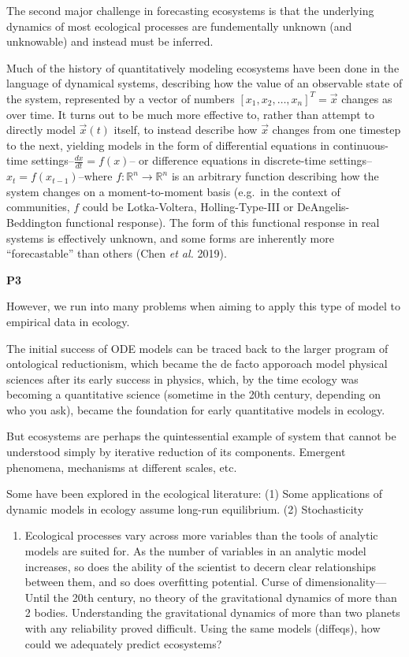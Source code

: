 \documentclass[11pt]{article}
\begin{document}
The second major challenge in forecasting ecosystems is that the
underlying dynamics of most ecological processes are fundementally
unknown (and unknowable) and instead must be inferred.

Much of the history of quantitatively modeling ecosystems have been done
in the language of dynamical systems, describing how the value of an
observable state of the system, represented by a vector of numbers
\([x_1, x_2, \dots, x_n]^T = \vec{x}\) changes as over time. It turns
out to be much more effective to, rather than attempt to directly model
\(\vec{x}(t)\) itself, to instead describe how \(\vec{x}\) changes from
one timestep to the next, yielding models in the form of differential
equations in continuous-time settings--\(\frac{dx}{dt} = f(x)\)-- or
difference equations in discrete-time
settings--\(x_t = f(x_{t-1})\)--where
\(f:\mathbb{R}^n \to \mathbb{R}^n\) is an arbitrary function describing
how the system changes on a moment-to-moment basis (e.g.~in the context
of communities, \(f\) could be Lotka-Voltera, Holling-Type-III or
DeAngelis-Beddington functional response). The form of this functional
response in real systems is effectively unknown, and some forms are
inherently more ``forecastable'' than others (Chen \emph{et al.} 2019).

\textbf{P3}

However, we run into many problems when aiming to apply this type of
model to empirical data in ecology.

The initial success of ODE models can be traced back to the larger
program of ontological reductionism, which became the de facto apporoach
model physical sciences after its early success in physics, which, by
the time ecology was becoming a quantitative science (sometime in the
20th century, depending on who you ask), became the foundation for early
quantitative models in ecology.

But ecosystems are perhaps the quintessential example of system that
cannot be understood simply by iterative reduction of its components.
Emergent phenomena, mechanisms at different scales, etc.

Some have been explored in the ecological literature: (1) Some
applications of dynamic models in ecology assume long-run equilibrium.
(2) Stochasticity

\begin{enumerate}
\def\labelenumi{(\arabic{enumi})}
\setcounter{enumi}{2}
\tightlist
\item
  Ecological processes vary across more variables than the tools of
  analytic models are suited for. As the number of variables in an
  analytic model increases, so does the ability of the scientist to
  decern clear relationships between them, and so does overfitting
  potential. Curse of dimensionality--- Until the 20th century, no
  theory of the gravitational dynamics of more than 2 bodies.
  Understanding the gravitational dynamics of more than two planets with
  any reliability proved difficult. Using the same models (diffeqs), how
  could we adequately predict ecosystems?
\end{enumerate}
\end{document}
